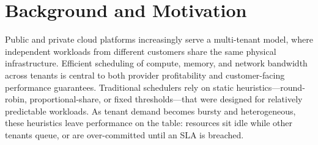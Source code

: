\section{Background and Motivation}
Public and private cloud platforms increasingly serve a multi-tenant model,
where independent workloads from different customers share the same
physical infrastructure. Efficient scheduling of compute, memory, and
network bandwidth across tenants is central to both provider profitability
and customer-facing performance guarantees. Traditional schedulers rely on
static heuristics---round-robin, proportional-share, or fixed
thresholds---that were designed for relatively predictable workloads. As
tenant demand becomes bursty and heterogeneous, these heuristics leave
performance on the table: resources sit idle while other tenants queue, or
are over-committed until an SLA is breached.
